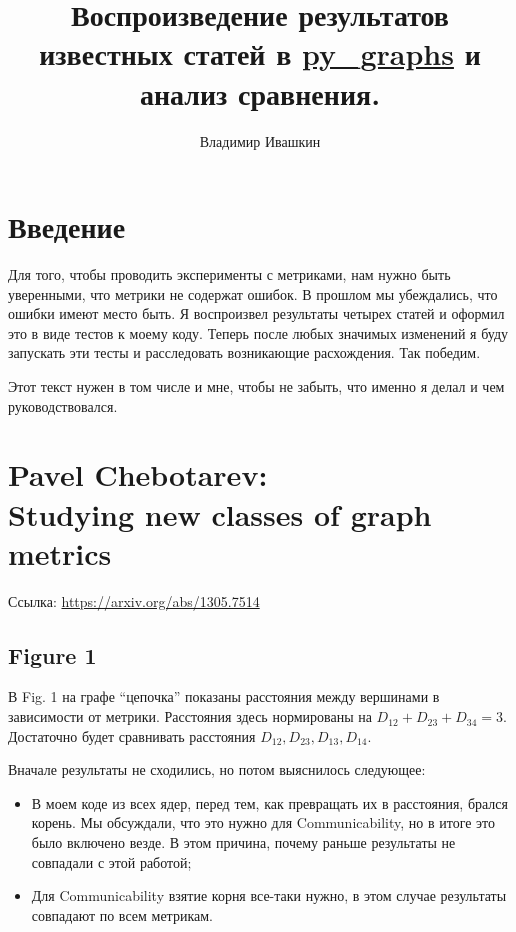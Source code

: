 \documentclass{article}
\title{
        Воспроизведение результатов известных статей в \href{https://github.com/illusionww/py_graphs}{py\_graphs} и анализ сравнения.
}
\author{Владимир Ивашкин}
\begin{document}
\maketitle


\section*{Введение}
Для того, чтобы проводить эксперименты с метриками, нам нужно быть уверенными, что метрики не содержат ошибок. В прошлом мы убеждались, что ошибки имеют место быть.
Я воспроизвел результаты четырех статей и оформил это в виде тестов к моему коду. Теперь после любых значимых изменений я буду запускать эти тесты и расследовать возникающие расхождения. Так победим.

Этот текст нужен в том числе и мне, чтобы не забыть, что именно я делал и чем руководствовался.

\tableofcontents

\section{Pavel Chebotarev:\\
         Studying new classes of graph metrics}
Ссылка: \url{https://arxiv.org/abs/1305.7514}

\subsection{Figure 1}
В Fig. 1 на графе ``цепочка'' показаны расстояния между вершинами в зависимости от метрики. Расстояния здесь нормированы на $D_{12} + D_{23} + D_{34} = 3$.
Достаточно будет сравнивать расстояния $D_{12}, D_{23}, D_{13}, D_{14}$.

Вначале результаты не сходились, но потом выяснилось следующее:
\begin{itemize}
  \item В моем коде из всех ядер, перед тем, как превращать их в расстояния, брался корень. Мы обсуждали, что это нужно для Communicability, но в итоге это было включено везде. В этом причина, почему раньше результаты не совпадали с этой работой;
  \item Для Communicability взятие корня все-таки нужно, в этом случае результаты совпадают по всем метрикам.
\end{itemize}
\end{document}
